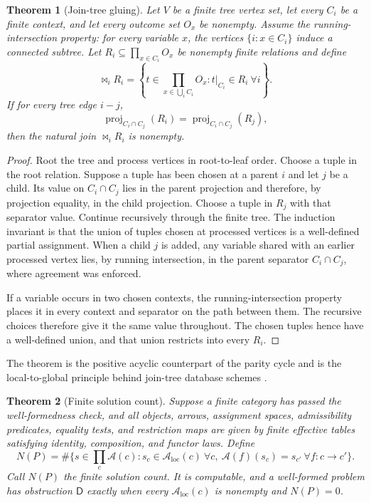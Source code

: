 \documentclass[11pt]{article}
\theoremstyle{plain}
\newtheorem{theorem}{Theorem}[section]
\theoremstyle{definition}
\theoremstyle{remark}
\newcommand{\LocalAdm}{\mathcal{A}_{\mathrm{loc}}}
\begin{document}
\begin{theorem}[Join-tree gluing]\label{thm:jointree}
Let $V$ be a finite tree vertex set, let every $C_i$ be a finite context, and
let every outcome set $O_x$ be nonempty. Assume the running-intersection
property: for every variable $x$, the vertices $\{i:x\in C_i\}$ induce a
connected subtree. Let $R_i\subseteq\prod_{x\in C_i}O_x$ be nonempty finite
relations and define
\[
\Join_iR_i=
\left\{t\in\prod_{x\in\bigcup_iC_i}O_x:
 t|_{C_i}\in R_i\ \forall i\right\}.
\]
If for every tree edge $i{-}j$,
\[
\operatorname{proj}_{C_i\cap C_j}(R_i)
=
\operatorname{proj}_{C_i\cap C_j}(R_j),
\]
then the natural join $\Join_iR_i$ is nonempty.
\end{theorem}

\begin{proof}
Root the tree and process vertices in root-to-leaf order. Choose a tuple in the
root relation. Suppose a tuple has been chosen at a parent $i$ and let $j$ be a
child. Its value on
$C_i\cap C_j$ lies in the parent projection and therefore, by projection
equality, in the child projection. Choose a tuple in $R_j$ with that separator
value. Continue recursively through the finite tree. The induction invariant is that
the union of tuples chosen at processed vertices is a well-defined partial
assignment. When a child $j$ is added, any variable shared with an earlier
processed vertex lies, by running intersection, in the parent separator
$C_i\cap C_j$, where agreement was enforced.

If a variable occurs in two chosen contexts, the running-intersection property
places it in every context and separator on the path between them. The recursive
choices therefore give it the same value throughout. The chosen tuples hence
have a well-defined union, and that union restricts into every $R_i$.
\end{proof}

The theorem is the positive acyclic counterpart of the parity cycle and is the
local-to-global principle behind join-tree database schemes \cite{beerifagin}.

\begin{theorem}[Finite solution count]\label{thm:finite-solution-count}
Suppose a finite category has passed the well-formedness check, and all objects,
arrows, assignment spaces, admissibility predicates, equality tests, and
restriction maps are given by finite effective tables satisfying identity,
composition, and functor laws. Define
\[
N(P)=\#\{s\in\textstyle\prod_c\mathcal A(c):
 s_c\in\LocalAdm(c)\ \forall c,
 \ \mathcal A(f)(s_c)=s_{c'}\ \forall f:c\to c'\}.
\]
Call $N(P)$ the \emph{finite solution count}. It is computable, and a
well-formed problem has obstruction
$\mathsf D$ exactly when every $\LocalAdm(c)$ is nonempty and $N(P)=0$.
\end{theorem}
\end{document}
